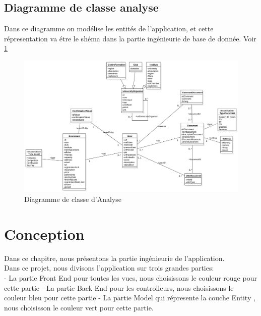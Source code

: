 \documentclass[12pt]{report}
\begin{document}
\begin{landscape}
\section{Diagramme de classe analyse}
Dans ce diagramme on modélise les entités de l'application, et cette répresentation va étre le shéma dans la partie ingénieurie de base de donnée. Voir \ref{fig:diagrammedeclasseanalyse}	
\begin{figure}[hbtp]
    \centering
    \includegraphics[width=1.1\textwidth]{AnalyseClassDiagram}
    \caption{Diagramme de classe d'Analyse}
    \label{fig:diagrammedeclasseanalyse}
\end{figure}
\end{landscape}
\restoregeometry
\newpage
\chapter{Conception}

Dans ce chapitre, nous présentons la partie ingénieurie de l'application.
\\

Dans ce projet, nous divisons l'application sur trois grandes parties: \\
- La partie Front End pour toutes les vues, nous choisissons le couleur rouge pour cette partie
- La partie Back End pour les controlleurs, nous choisissons le couleur bleu pour cette partie
- La partie Model qui répresente la couche Entity , nous choisisson le couleur vert pour cette partie.
\\
\end{document}
